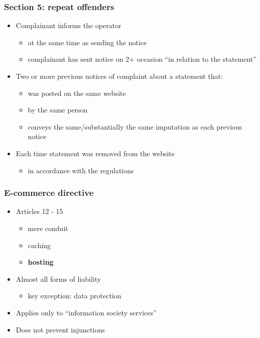 \documentclass[ignorenonframetext,]{beamer}
\begin{document}

\begin{frame}
  \frametitle{Section 5: repeat offenders}
\begin{itemize}
\item Complainant informs the operator
  \begin{itemize}
  \item at the same time as sending the notice
  \item complainant has sent notice on 2+ occasion ``in relation to the statement''
  \end{itemize}
\item Two or more previous notices of complaint about a statement that:
  \begin{itemize}
  \item was posted on the same website
  \item by the same person
  \item conveys the same/substantially the same imputation as each previous notice
  \end{itemize}
\item Each time statement was removed from the website
  \begin{itemize}
  \item in accordance with the regulations
  \end{itemize}
\end{itemize}

\end{frame}

\begin{frame}
\frametitle{E-commerce directive}

\begin{itemize}
\item  Articles 12 - 15
  \begin{itemize}
  \item mere conduit
  \item caching
  \item {\bf hosting}
  \end{itemize}

  \item Almost all forms of liability
    \begin{itemize}
    \item key exception: data protection
    \end{itemize}
  \item Applies only to ``information society services''
  \item Does not prevent injunctions

\end{itemize}

\end{frame}
\end{document}
